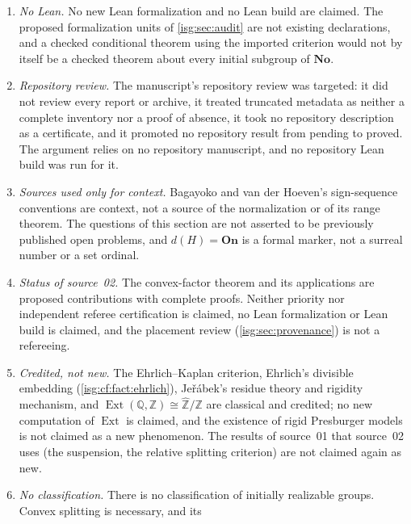 \documentclass[11pt]{article}
\theoremstyle{definition}
\theoremstyle{remark}
\newcommand{\No}{\ensuremath{\mathbf{No}}}
\newcommand{\On}{\ensuremath{\mathbf{On}}}
\newcommand{\Z}{\mathbb{Z}}
\newcommand{\Q}{\mathbb{Q}}
\newcommand{\Zhat}{\widehat{\Z}}
\newcommand{\Ext}{\operatorname{Ext}}
\begin{document}
\begin{enumerate}[label=\textup{(N\arabic*)},leftmargin=*]
      imported criterion, or the absence of a transfinite proof gap; the
      written proofs carry the general claims. Compiling and rendering the
      document establish its integrity, not its correctness.
\item \emph{No Lean.} No new Lean formalization and no Lean build are
      claimed. The proposed formalization units of \cref{isg:sec:audit} are
      not existing declarations, and a checked conditional theorem using
      the imported criterion would not by itself be a checked theorem
      about every initial subgroup of $\No$.
\item \emph{Repository review.} The manuscript's repository review was
      targeted: it did not review every report or archive, it treated
      truncated metadata as neither a complete inventory nor a proof of
      absence, it took no repository description as a certificate, and it
      promoted no repository result from pending to proved. The argument
      relies on no repository manuscript, and no repository Lean build was
      run for it.
\item \emph{Sources used only for context.} Bagayoko and van der Hoeven's
      sign-sequence conventions are context, not a source of the
      normalization or of its range theorem. The questions of this section
      are not asserted to be previously published open problems, and
      $d(H)=\On$ is a formal marker, not a surreal number or a set
      ordinal.
\item \emph{Status of source~02.} The convex-factor theorem and its
      applications are proposed contributions with complete proofs.
      Neither priority nor independent referee certification is claimed,
      no Lean formalization or Lean build is claimed, and the placement
      review (\cref{isg:sec:provenance}) is not a refereeing.
\item \emph{Credited, not new.} The Ehrlich--Kaplan criterion,
      Ehrlich's divisible embedding (\cref{isg:cf:fact:ehrlich}),
      Je\v r\'abek's residue theory and rigidity mechanism, and
      $\Ext(\Q,\Z)\cong\Zhat/\Z$ are classical and credited; no new
      computation of $\Ext$ is claimed, and the existence of rigid
      Presburger models is not claimed as a new phenomenon. The results
      of source~01 that source~02 uses (the suspension, the relative
      splitting criterion) are not claimed again as new.
\item \emph{No classification.} There is no classification of initially
      realizable groups. Convex splitting is necessary, and its

\end{enumerate}
\end{document}
